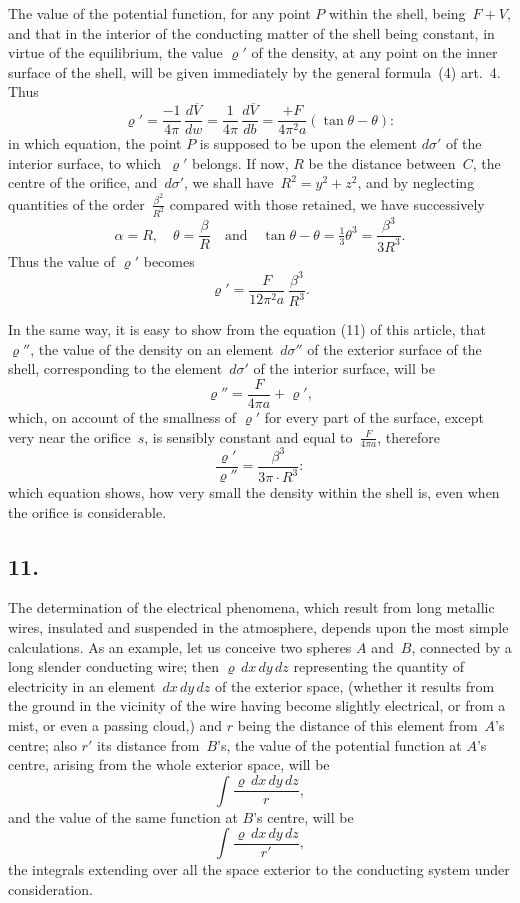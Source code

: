 \documentclass[12pt,notitlepage]{amsart}
\newcommand\Section[1]{\subsection{{#1}}}
\renewcommand{\rho}{\varrho}
\begin{document}
The value of the potential function, for any point $P$ within the shell,
being~${F+V}$, and that in the interior of the conducting matter of the shell
being constant, in virtue of the equilibrium,
the value $\rho'$ of the density, at
any point on the inner surface of the shell, will be given immediately by the
general formula~(4) art.~4. Thus
\[
\rho'=\frac{-1}{4\pi}\,\frac{d\overline{V}}{dw}
=\frac{1}{4\pi}\,\frac{d\overline{V}}{db}
=\frac{+F}{4\pi^2a}(\tan\theta-\theta):
\]
in which equation, the point $P$ is supposed to be upon
the element $d\sigma'$ of the
interior surface, to which~$\rho'$ belongs.
If now, $R$ be the distance between~$C$,
the centre of the orifice, and~$d\sigma'$,
we shall have~$R^2=y^2+z^2$, and by neglecting
quantities of the order~$\frac{\beta^2}{R^2}$
compared with those retained, we have successively
\[
\alpha=R,\quad
\theta=\frac{\beta}{R}\quad\text{and}\quad
\tan\theta-\theta=\tfrac13\theta^3=\frac{\beta^3}{3R^3}.
\]
Thus the value of $\rho'$ becomes
\[
\rho'=\frac{F}{12\pi^2a}\,\frac{\beta^3}{R^3}.
\]

In the same way, it is easy to show from the equation (11) of this
article, that~$\rho''$,
the value of the density on an element~$d\sigma''$ of the exterior
surface of the shell, corresponding
to the element~$d\sigma'$ of the interior surface,
will be
\[
\rho''=\frac{F}{4\pi a}+\rho',
\]
which, on account of the smallness of $\rho'$
for every part of the surface, except
very near the orifice~$s$,
is sensibly constant and equal to~$\frac{F}{4\pi a}$, therefore
\[
\frac{\rho'}{\rho''}=\frac{\beta^3}{3\pi\cdot R^3}:
\]
which equation shows, how very small the density within the shell is, even
when the orifice is considerable.
\bigskip

\Section{11.}
The determination of the electrical phenomena, which result from long
metallic wires, insulated and suspended in the atmosphere, depends upon the
most simple calculations. As an example,
let us conceive two spheres $A$ and~$B$,
connected by a long slender conducting wire;
then $\rho\,dx\,dy\,dz$ representing the
quantity of electricity in an element~$dx\,dy\,dz$ of the exterior space,
(whether
it results from the ground in the vicinity of the wire having become slightly
electrical, or from a mist, or even a passing cloud,) and $r$ being the distance
of this element from~$A$'s centre;
also $r'$ its distance from~$B$'s, the value of
the potential function at $A$'s centre, arising from the whole exterior space,
will be
\[
\int\frac{\rho\,dx\,dy\,dz}{r},
\]
and the value of the same function at $B$'s centre, will be
\[
\int\frac{\rho\,dx\,dy\,dz}{r'},
\]
the integrals extending over all the space exterior to the conducting system
under consideration.
\end{document}
